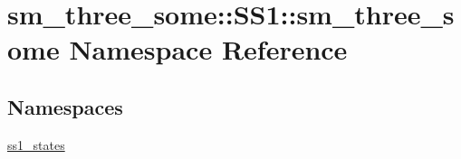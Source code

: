 \hypertarget{namespacesm__three__some_1_1SS1_1_1sm__three__some}{}\section{sm\+\_\+three\+\_\+some\+:\+:S\+S1\+:\+:sm\+\_\+three\+\_\+some Namespace Reference}
\label{namespacesm__three__some_1_1SS1_1_1sm__three__some}
\subsection*{Namespaces}
\begin{DoxyCompactItemize}
\item 
 \hyperlink{namespacesm__three__some_1_1SS1_1_1sm__three__some_1_1ss1__states}{ss1\+\_\+states}
\end{DoxyCompactItemize}
